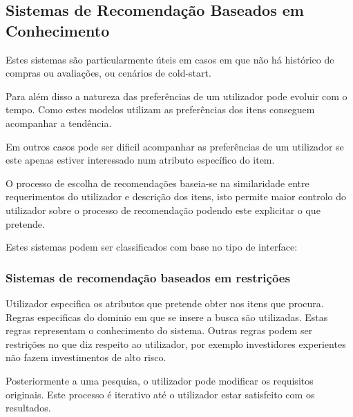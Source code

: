 \subsection{Sistemas de Recomendação Baseados em Conhecimento}
\hfill
\par Estes sistemas são particularmente úteis em casos em que não há histórico de compras ou avaliações, ou cenários de cold-start.
\par Para além disso a natureza das preferências de um utilizador pode evoluir com o tempo. Como estes modelos utilizam as preferências dos itens conseguem acompanhar a tendência.
\par Em outros casos pode ser dificil acompanhar as preferências de um utilizador se este apenas estiver interessado num atributo específico do item.
\par O processo de escolha de recomendações baseia-se na similaridade entre requerimentos do utilizador e descrição dos itens, isto permite maior controlo do utilizador sobre o processo de recomendação podendo este explicitar o que pretende.
\par Estes sistemas podem ser classificados com base no tipo de interface: 
\hfill


\subsubsection{Sistemas de recomendação baseados em restrições}
\hfill
\newline
\par Utilizador especifica os atributos que pretende obter nos itens que procura. Regras especificas do dominio em que se insere a busca são utilizadas. Estas regras representam o conhecimento do sistema. Outras regras podem ser restrições no que diz respeito ao utilizador, por exemplo investidores experientes não fazem investimentos de alto risco. 
\par Posteriormente a uma pesquisa, o utilizador pode modificar os requisitos originais. Este processo é iterativo até o utilizador estar satisfeito com os resultados.
\hfill


